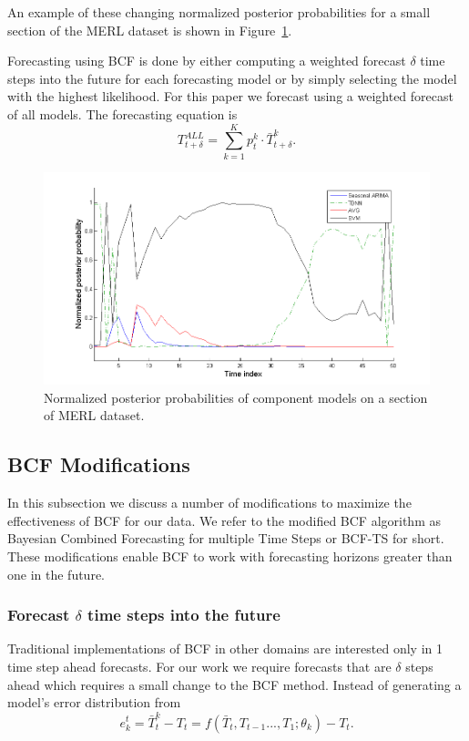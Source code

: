\documentclass{acm_proc_article-sp}
\begin{document}
An example of these changing normalized posterior probabilities for a small section of the MERL dataset is shown in Figure~\ref{fig:probsmerl}.

Forecasting using BCF is done by either computing a weighted forecast $\delta$ time steps into the future for each forecasting model or by simply selecting the model with the highest likelihood.  For this paper we forecast using a weighted forecast of all models.  The forecasting equation is
\begin{equation}
T_{t + \delta}^{ALL} = \sum_{k=1}^{K}p_{t}^{k} \cdot \bar{T}_{t + \delta}^{k}.
\end{equation}

\begin{figure}
\centering
\includegraphics[width = 1.0\linewidth]{posterior_probs.png}
\caption{Normalized posterior probabilities of component models on a section of MERL dataset.}
\label{fig:probsmerl}
\end{figure}

\subsection{BCF Modifications}
In this subsection we discuss a number of modifications to maximize the effectiveness of BCF for our data.  We refer to the modified BCF algorithm as Bayesian Combined Forecasting for multiple Time Steps or BCF-TS for short.  These modifications  enable BCF to work with forecasting horizons greater than one in the future.

\subsubsection{Forecast $\delta$ time steps into the future}
Traditional implementations of BCF in other domains \cite{Petridis2001, Zheng2006} are interested only in 1 time step ahead forecasts.  For our work we require forecasts that are $\delta$ steps ahead which requires a small change to the BCF method.  Instead of generating a model's error distribution from 
\begin{equation}
e^{t}_{k} = \bar{T}_{t}^{k} - T_{t} = f(\bar{T}_{t},T_{t - 1} ..., T_{1}; \theta_{k}) - T_{t}.
\end{equation}
\end{document}
